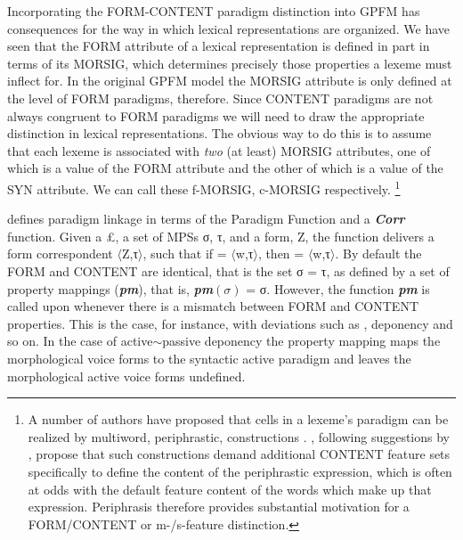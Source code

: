 \documentclass[output=paper,
modfonts
]{LSP/langsci}
\begin{document}
\largerpage[-2]
Incorporating the FORM-CONTENT paradigm distinction into GPFM has consequences for the way in which lexical representations are organized. We have seen that  the FORM attribute of a lexical representation is defined in part in terms of its MORSIG, which determines precisely those properties a lexeme must inflect for. In the original GPFM model the MORSIG attribute is only defined at the level of FORM paradigms, therefore. Since CONTENT paradigms are not always congruent to FORM paradigms we will need to draw the appropriate distinction in lexical representations. The obvious way to do this is to assume that each lexeme is associated with \emph{two} (at least) MORSIG attributes, one of which is a value  of the FORM attribute and the other of which is a value of the SYN attribute. We can call these f-MORSIG, c-MORSIG respectively.%
\footnote{A number of authors have proposed that cells in a lexeme’s paradigm can be realized by multiword, periphrastic, constructions \parencite{Sadler:Spencer01,Brown:etal12:periphrasis,Bonami15:collocation}. \citet{Popova:Spencer17:FDSL11}, following suggestions by \citet{Bonami15:collocation}, propose that such constructions demand additional CONTENT feature sets specifically to define the content of the periphrastic expression, which is often at odds with the default feature content of the words which make up that expression. Periphrasis therefore provides substantial  motivation for a FORM/CONTENT or m-/s-feature \parencite{Sadler:Spencer01} distinction.%
} %
 

\citet[253]{Stump16:book} defines paradigm linkage in terms of the Paradigm Function and a \textbf{\textit{Corr}} function. Given a   \pounds, a set of MPSs σ, τ,  and a  form, Z, the function  delivers a form correspondent $\langle$Z,τ$\rangle$, such that if  = $\langle$w,τ$\rangle$, then  = $\langle$w,τ$\rangle$. By default the FORM and CONTENT  are identical, that is the set σ = τ, as defined by a set of property mappings (\textbf{\textit{pm}}), that is, 
\textbf{\textit{pm}}$(\sigma)$ = σ. However, the function \textbf{\textit{pm}} is called upon whenever there is a mismatch between FORM and CONTENT properties. This is the case, for instance, with  deviations such as , deponency and so on. In the case of active$\sim$passive deponency the property mapping maps the morphological  voice forms to the syntactic active paradigm and leaves the morphological active voice forms undefined. 
\end{document}
